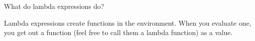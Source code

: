 \begin{blocksection}
\question What do lambda expressions do?

\begin{solution}[0.25in]
Lambda expressions create functions in the environment. When you evaluate one, you get out a function (feel free to call them a lambda function) as a value.
\end{solution}
\end{blocksection}
